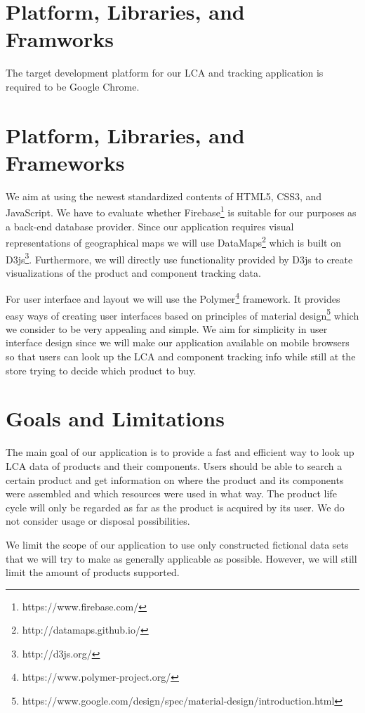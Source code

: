 \documentclass[a4page]{article}
\begin{document}
\section{Platform, Libraries, and Framworks}
The target development platform for our LCA and tracking application is required to be Google Chrome. 
\section{Platform, Libraries, and Frameworks}
We aim at using the newest standardized contents of HTML5, CSS3, and JavaScript. We have to evaluate whether Firebase\footnote{https://www.firebase.com/} is suitable for our purposes as a back-end database provider.
Since our application requires visual representations of geographical maps we will use DataMaps\footnote{http://datamaps.github.io/} which is built on D3js\footnote{http://d3js.org/}.
Furthermore, we will directly use functionality provided by D3js to create visualizations of the product and component tracking data.

For user interface and layout we will use the Polymer\footnote{https://www.polymer-project.org/} framework. 
It provides easy ways of creating user interfaces based on principles of material design\footnote{https://www.google.com/design/spec/material-design/introduction.html} which we consider to be very appealing and simple.
We aim for simplicity in user interface design since we will make our application available on mobile browsers so that users can look up the LCA and component tracking info while still at the store trying to decide which product to buy.

\section{Goals and Limitations}
The main goal of our application is to provide a fast and efficient way to look up LCA data of products and their components.
Users should be able to search a certain product and get information on where the product and its components were assembled and which resources were used in what way.
The product life cycle will only be regarded as far as the product is acquired by its user.
We do not consider usage or disposal possibilities. 


We limit the scope of our application to use only constructed fictional data sets that we will try to make as generally applicable as possible. However, we will still limit the amount of products supported.
\end{document}
